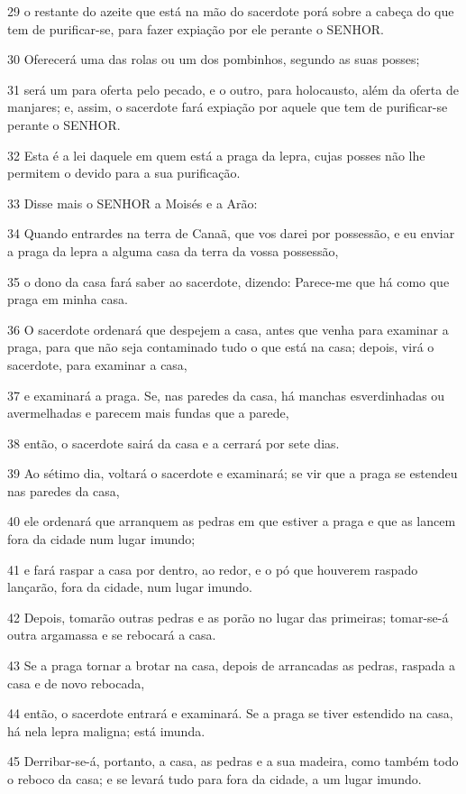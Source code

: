 \par 29 o restante do azeite que está na mão do sacerdote porá sobre a cabeça do que tem de purificar-se, para fazer expiação por ele perante o SENHOR.
\par 30 Oferecerá uma das rolas ou um dos pombinhos, segundo as suas posses;
\par 31 será um para oferta pelo pecado, e o outro, para holocausto, além da oferta de manjares; e, assim, o sacerdote fará expiação por aquele que tem de purificar-se perante o SENHOR.
\par 32 Esta é a lei daquele em quem está a praga da lepra, cujas posses não lhe permitem o devido para a sua purificação.
\par 33 Disse mais o SENHOR a Moisés e a Arão:
\par 34 Quando entrardes na terra de Canaã, que vos darei por possessão, e eu enviar a praga da lepra a alguma casa da terra da vossa possessão,
\par 35 o dono da casa fará saber ao sacerdote, dizendo: Parece-me que há como que praga em minha casa.
\par 36 O sacerdote ordenará que despejem a casa, antes que venha para examinar a praga, para que não seja contaminado tudo o que está na casa; depois, virá o sacerdote, para examinar a casa,
\par 37 e examinará a praga. Se, nas paredes da casa, há manchas esverdinhadas ou avermelhadas e parecem mais fundas que a parede,
\par 38 então, o sacerdote sairá da casa e a cerrará por sete dias.
\par 39 Ao sétimo dia, voltará o sacerdote e examinará; se vir que a praga se estendeu nas paredes da casa,
\par 40 ele ordenará que arranquem as pedras em que estiver a praga e que as lancem fora da cidade num lugar imundo;
\par 41 e fará raspar a casa por dentro, ao redor, e o pó que houverem raspado lançarão, fora da cidade, num lugar imundo.
\par 42 Depois, tomarão outras pedras e as porão no lugar das primeiras; tomar-se-á outra argamassa e se rebocará a casa.
\par 43 Se a praga tornar a brotar na casa, depois de arrancadas as pedras, raspada a casa e de novo rebocada,
\par 44 então, o sacerdote entrará e examinará. Se a praga se tiver estendido na casa, há nela lepra maligna; está imunda.
\par 45 Derribar-se-á, portanto, a casa, as pedras e a sua madeira, como também todo o reboco da casa; e se levará tudo para fora da cidade, a um lugar imundo.
